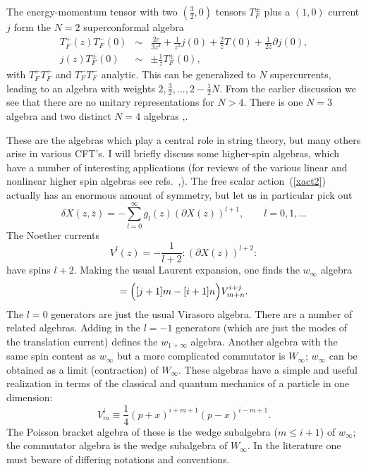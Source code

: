 The energy-momentum tensor with two $(\frac{3}{2},0)$ tensors
$T_F^\pm$ plus a $(1,0)$ current $j$ form the $N=2$ superconformal
algebra~\cite{Aetal}
\begin{eqnarray}
T^+_F(z) T^-_F(0) &\sim& \frac{2c}{3z^3} +
\frac{1}{z^2} j(0) + \frac{2}{z} T(0) + \frac{1}{2z} \partial j(0),
\nonumber\\
j(z) T^{\pm}_F(0) &\sim& \pm \frac{1}{z} T^{\pm}_F(0), \label{n2sc}
\end{eqnarray}
with $T_F^+ T_F^+$ and $T_F^- T_F^-$ analytic.  This can be
generalized to $N$ supercurrents, leading to an algebra with weights
$2, \frac{3}{2}, \ldots, 2 - \frac{1}{2}N$.  From the earlier
discussion we see that there are no unitary representations for
$N > 4$.  There is one $N=3$ algebra and two distinct $N=4$ algebras
\cite{Aetal},\cite{EguT}.

These are the algebras which play a central role in string theory,
but many others arise in various CFT's.  I will briefly discuss
some higher-spin algebras, which have a number of interesting
applications (for reviews of the various linear and nonlinear
higher spin algebras see refs.~\cite{PRS},\cite{BS}).
The free scalar action~(\ref{xact2})
actually has an enormous amount of symmetry, but let us in
particular pick out
\begin{equation}
\delta X(z,\bar z) = - \sum_{l=0}^\infty g_l(z) (\partial
X(z))^{l+1},
\qquad l = 0,1,\ldots
\end{equation}
The Noether currents
\begin{equation}
V^l(z) = -\frac{1}{l+2} :\! (\partial X(z))^{l+2} \!:
\end{equation}
have spins $l+2$.  Making the usual Laurent expansion, one finds
the $w_\infty$ algebra
\begin{equation}
[V^i_m, V^j_n] = \Bigl( [j+1]m - [i+1]n \Bigr) V^{i+j}_{m+n}.
\label{winf}
\end{equation}
The $l = 0$ generators are just the usual Virasoro algebra.
There are a number of related algebras.  Adding in the $l = -1$
generators (which are just the modes of the translation current)
defines the $w_{1+\infty}$ algebra.  Another algebra with the same
spin content as $w_\infty$ but a more complicated commutator is
$W_\infty$; $w_\infty$ can be obtained as a limit (contraction) of
$W_\infty$.
These algebras have a simple and useful
realization in terms of the classical and quantum mechanics of a
particle in one dimension:
\begin{equation}
V^i_m \equiv \frac{1}{4} (p+x)^{i+m+1} (p-x)^{i-m+1}.
\end{equation}
The Poisson bracket algebra of these is the wedge
subalgebra ($m \leq i+1$) of $w_{\infty}$; the commutator algebra is
the wedge subalgebra of $W_{\infty}$.  In the literature one must
beware of differing notations and conventions.

